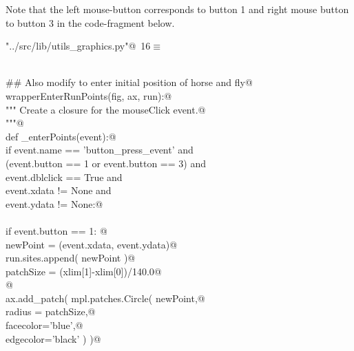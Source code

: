 \documentclass[11.5pt]{report}
\begin{document}
Note that the left mouse-button corresponds to button 1 and right mouse button
to button 3 in the code-fragment below. 

\begin{flushleft} \small\label{scrap7}\raggedright\small
{} \verb@"../src/lib/utils_graphics.py"@\nobreak\ {\footnotesize {16}}$\equiv$
\vspace{-1ex}
\begin{list}{}{} \item
\mbox{}\verb@@\\
\mbox{}\verb@## Also modify to enter initial position of horse and fly@\\
\mbox{}\verb@def wrapperEnterRunPoints(fig, ax, run):@\\
\mbox{}\verb@    """ Create a closure for the mouseClick event.@\\
\mbox{}\verb@    """@\\
\mbox{}\verb@    def _enterPoints(event):@\\
\mbox{}\verb@        if event.name     == 'button_press_event'      and \@\\
\mbox{}\verb@           (event.button   == 1 or event.button == 3)  and \@\\
\mbox{}\verb@           event.dblclick == True                      and \@\\
\mbox{}\verb@           event.xdata    != None                      and \@\\
\mbox{}\verb@           event.ydata    != None:@\\
\mbox{}\verb@@\\
\mbox{}\verb@             if event.button == 1:        @\\
\mbox{}\verb@               newPoint = (event.xdata, event.ydata)@\\
\mbox{}\verb@               run.sites.append( newPoint  )@\\
\mbox{}\verb@               patchSize  = (xlim[1]-xlim[0])/140.0@\\
\mbox{}\verb@   @\\
\mbox{}\verb@               ax.add_patch( mpl.patches.Circle( newPoint,@\\
\mbox{}\verb@                                              radius = patchSize,@\\
\mbox{}\verb@                                              facecolor='blue',@\\
\mbox{}\verb@                                              edgecolor='black'   )  )@\\

\end{list}
\end{flushleft}
\end{document}

